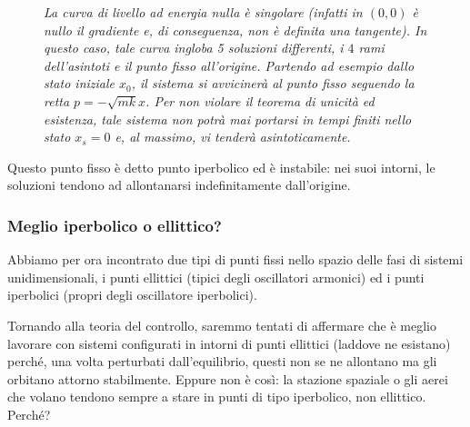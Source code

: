 \documentclass[a4paper,openany]{article}
\begin{document}
	\begin{figure}[H]
		\centering
		\caption{\textit{La curva di livello ad energia nulla è singolare (infatti in $(0,0)$ è nullo il gradiente e, di conseguenza, non è definita una tangente). In questo caso, tale curva ingloba 5 soluzioni differenti, i $4$ rami dell'asintoti e il punto fisso all'origine. Partendo ad esempio dallo stato iniziale $x_{0}$, il sistema si avvicinerà al punto fisso seguendo la retta $p = -\sqrt{mk}x$. Per non violare il teorema di unicità ed esistenza, tale sistema non potrà mai portarsi in tempi finiti nello stato $x_{s}=0$ e, al massimo, vi tenderà asintoticamente.}}
	\end{figure}
	
	Questo punto fisso è detto punto iperbolico ed è instabile: nei suoi intorni, le soluzioni tendono ad allontanarsi indefinitamente dall'origine.
	\subsubsection{Meglio iperbolico o ellittico?}
	Abbiamo per ora incontrato due tipi di punti fissi nello spazio delle fasi di sistemi unidimensionali, i punti ellittici (tipici degli oscillatori armonici) ed i punti iperbolici (propri degli oscillatore iperbolici). 
	
	Tornando alla teoria del controllo, saremmo tentati di affermare che è meglio lavorare con sistemi configurati in intorni di punti ellittici (laddove ne esistano) perché, una volta perturbati dall'equilibrio, questi non se ne allontano ma gli orbitano attorno stabilmente.
	Eppure non è così: la stazione spaziale o gli aerei che volano tendono sempre a stare in punti di tipo iperbolico, non ellittico. Perché? 
	
\end{document}
